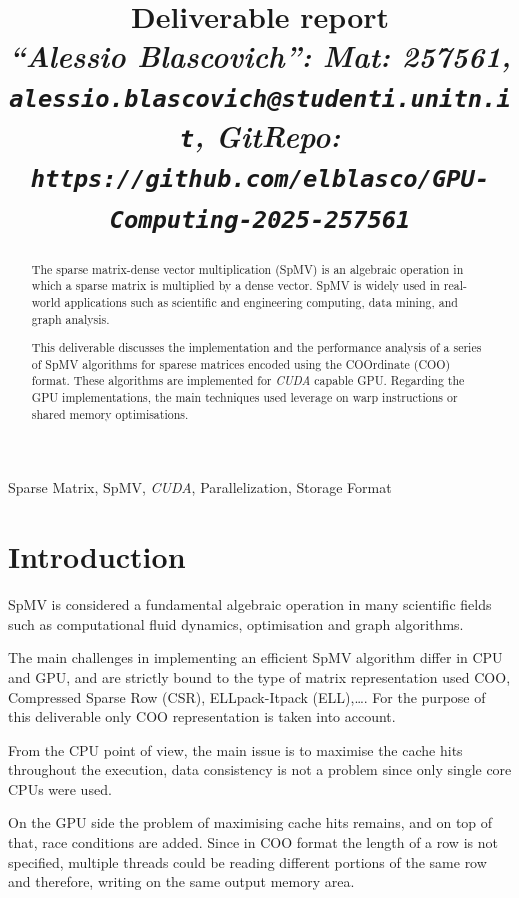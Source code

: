 \documentclass[conference]{IEEEtran}
\begin{document}
\title{Deliverable report \\
\footnotesize \textit{``Alessio Blascovich'': Mat: 257561, \texttt{alessio.blascovich@studenti.unitn.it}, GitRepo: \texttt{https://github.com/elblasco/GPU-Computing-2025-257561}}}

\maketitle

\begin{abstract}
The sparse matrix-dense vector multiplication (SpMV) is an algebraic operation in which a sparse matrix is multiplied by a dense vector. SpMV is widely used in real-world applications such as scientific and engineering computing, data mining, and graph analysis.

This deliverable discusses the implementation and the performance analysis of a series of SpMV algorithms for sparese matrices encoded using the COOrdinate (COO) format. These algorithms are implemented for \emph{CUDA} capable GPU. Regarding the GPU implementations, the main techniques used leverage on warp instructions or shared memory optimisations.
\end{abstract}

\begin{IEEEkeywords}
Sparse Matrix, SpMV, \emph{CUDA}, Parallelization, Storage Format
\end{IEEEkeywords}

\section{Introduction}
SpMV is considered a fundamental algebraic operation in many scientific fields such as computational fluid dynamics, optimisation and graph algorithms.

The main challenges in implementing an efficient SpMV algorithm differ in CPU and GPU, and are strictly bound to the type of matrix representation used COO, Compressed Sparse Row (CSR), ELLpack-Itpack (ELL),\dots. For the purpose of this deliverable only COO representation is taken into account.

From the CPU point of view, the main issue is to maximise the cache hits throughout the execution, data consistency is not a problem since only single core CPUs were used.

On the GPU side the problem of maximising cache hits remains, and on top of that, race conditions are added. Since in COO format the length of a row is not specified, multiple threads could be reading different portions of the same row and therefore, writing on the same output memory area.
\end{document}
